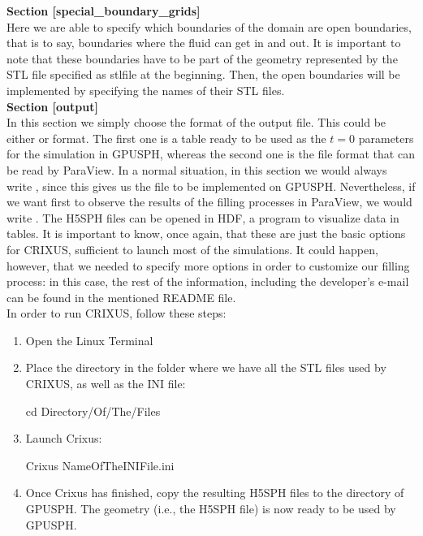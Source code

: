 \documentclass[12pt]{memoir}
\begin{document}
\textbf{Section [special\_boundary\_grids]}\\
Here we are able to specify which boundaries of 
the domain are open boundaries, that is to say, 
boundaries where the fluid can get in and out. 
It is important to note that these boundaries have 
to be part of the geometry represented by the STL 
file specified as stlfile at the beginning. 
Then, the open boundaries will be implemented by specifying 
the names of their STL files.\\

\textbf{Section [output]}\\
In this section we simply choose the format of the output file. 
This could be either  or  format. 
The first one is a table ready to be used as the $t=0$ 
parameters for the simulation in GPUSPH, whereas the second 
one is the file format that can be read by ParaView. 
In a normal situation, in this section we would 
always write , since this gives us the file 
to be implemented on GPUSPH. Nevertheless, if we want first 
to observe the results of the filling processes in ParaView, 
we would write . 
The H5SPH files can be opened in HDF, a program to visualize data in tables.
It is important to know, once again, that these are just the basic options for CRIXUS, 
sufficient to launch most of the simulations. 
It could happen, however, that we needed to specify more options 
in order to customize our filling process: in this case, 
the rest of the information, including the developer’s e-mail 
can be found in the mentioned README file.\\

In order to run CRIXUS, follow these steps:
\begin{enumerate}
\item Open the Linux Terminal
\item Place the directory in the folder where we 
have all the STL files used by CRIXUS, as well as the INI file:
\begin{shellcode}
cd Directory/Of/The/Files
\end{shellcode}
\item Launch Crixus:
\begin{shellcode}
Crixus NameOfTheINIFile.ini
\end{shellcode}
\item Once Crixus has finished, copy the resulting H5SPH files to the  directory of GPUSPH. 
The geometry (i.e., the H5SPH file) is now ready to be used by GPUSPH.
\end{enumerate}
\end{document}

